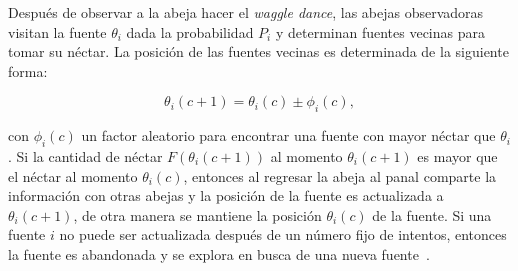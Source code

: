 Después de observar a la abeja hacer el \textit{waggle dance}, las abejas
observadoras visitan la fuente $\theta_{i}$ dada la probabilidad $P_{i}$ y
determinan fuentes vecinas para tomar su néctar. La posición de las fuentes
vecinas es determinada de la siguiente forma:

\begin{displaymath}
  \theta_{i}(c+1) = \theta_{i}(c) \pm \phi_{i}(c),
\end{displaymath}

\noindent
con $\phi_{i}(c)$ un factor aleatorio para encontrar una fuente con mayor
néctar que $\theta_{i}$. Si la cantidad de néctar $F(\theta_{i}(c+1))$ al
momento $\theta_{i}(c+1)$ es mayor que el néctar al momento $\theta_{i}(c)$,
entonces al regresar la abeja al panal comparte la información con otras abejas
y la posición de la fuente es actualizada a $\theta_{i}(c+1)$, de otra manera
se mantiene la posición $\theta_{i}(c)$ de la fuente. Si una fuente $i$ no
puede ser actualizada después de un número fijo de intentos, entonces la
fuente es abandonada y se explora en busca de una nueva
fuente~\cite{karaboga2008performance}.

